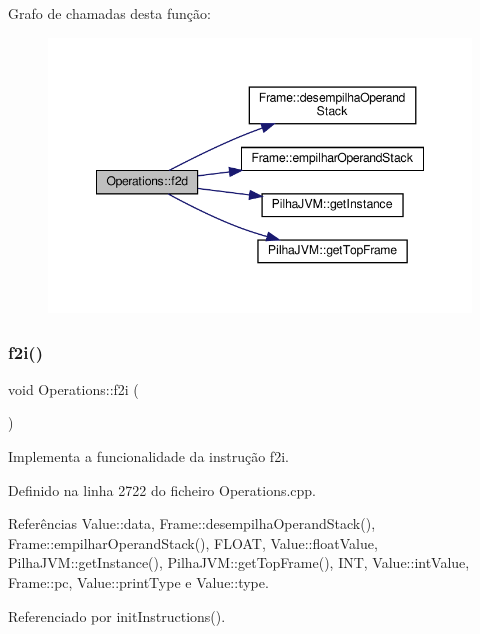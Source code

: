 Grafo de chamadas desta função\+:\nopagebreak
\begin{figure}[H]
\begin{center}
\leavevmode
\includegraphics[width=348pt]{classOperations_afb29ca09bc75d3342920b1509aba3635_cgraph}
\end{center}
\end{figure}
\mbox{\label{classOperations_adea8a32fb2ba183d0200ac22e1126fde}} 
\subsubsection{\texorpdfstring{f2i()}{f2i()}}
{\footnotesize\ttfamily void Operations\+::f2i (\begin{DoxyParamCaption}{ }\end{DoxyParamCaption})\hspace{0.3cm}{\ttfamily [private]}}



Implementa a funcionalidade da instrução f2i. 



Definido na linha 2722 do ficheiro Operations.\+cpp.



Referências Value\+::data, Frame\+::desempilha\+Operand\+Stack(), Frame\+::empilhar\+Operand\+Stack(), F\+L\+O\+AT, Value\+::float\+Value, Pilha\+J\+V\+M\+::get\+Instance(), Pilha\+J\+V\+M\+::get\+Top\+Frame(), I\+NT, Value\+::int\+Value, Frame\+::pc, Value\+::print\+Type e Value\+::type.



Referenciado por init\+Instructions().

